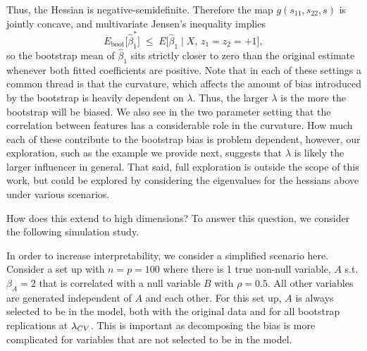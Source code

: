 \noindent Thus, the Hessian is negative-semidefinite.  Therefore the map $g(s_{11},s_{22},s)$ is jointly concave, and multivariate Jensen's inequality implies
$$
E_{\text{boot}}\bigl[\hat\beta_{1}^{*}\bigr]
  \;\le\; E\bigl[\hat\beta_{1}\mid X,\,z_{1}=z_{2}=+1\bigr],
$$
so the bootstrap mean of $\hat\beta_{1}$ sits strictly closer to zero than the original estimate whenever both fitted coefficients are positive. Note that in each of these settings a common thread is that the curvature, which affects the amount of bias introduced by the bootstrap is heavily dependent on $\lambda$. Thus, the larger $\lambda$ is the more the bootstrap will be biased. We also see in the two parameter setting that the correlation between features has a considerable role in the curvature. How much each of these contribute to the bootstrap bias is problem dependent, however, our exploration, such as the example we provide next, suggests that $\lambda$ is likely the larger influencer in general. That said, full exploration is outside the scope of this work, but could be explored by considering the eigenvalues for the hessians above under various scenarios.

How does this extend to high dimensions? To answer this question, we consider the following simulation study.

In order to increase interpretability, we consider a simplified scenario here. Consider a set up with $n = p = 100$ where there is 1 true non-null variable, $A$ s.t. $\beta_A = 2$ that is correlated with a null variable $B$ with $\rho = 0.5$. All other variables are generated independent of $A$ and each other. For this set up, $A$ is always selected to be in the model, both with the original data and for all bootstrap replications at $\lambda_{CV}$. This is important as decomposing the bias is more complicated for variables that are not selected to be in the model.

